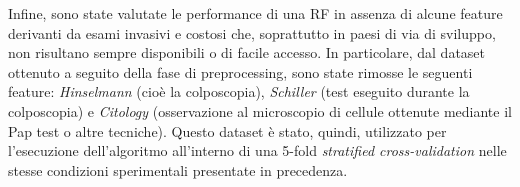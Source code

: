 Infine, sono state valutate le performance di una RF in assenza di alcune feature derivanti da esami invasivi e costosi che, soprattutto in paesi di via di sviluppo, non risultano sempre disponibili o di facile accesso.
In particolare, dal dataset ottenuto a seguito della fase di preprocessing, sono state rimosse le seguenti feature: \textit{Hinselmann} (cioè la colposcopia), \textit{Schiller} (test eseguito durante la colposcopia) e \textit{Citology} (osservazione  al microscopio di cellule ottenute mediante il Pap test o altre tecniche).
Questo dataset è stato, quindi, utilizzato per l'esecuzione dell'algoritmo all'interno di una 5-fold \textit{stratified cross-validation} nelle stesse condizioni sperimentali presentate in precedenza.